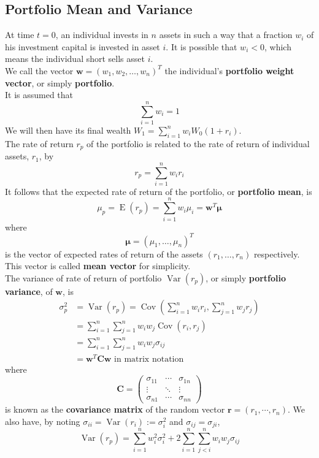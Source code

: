 \documentclass[12pt]{article}
\theoremstyle{definition}
\DeclareMathOperator{\expec}{E}
\DeclareMathOperator{\var}{Var}
\DeclareMathOperator{\cov}{Cov}
\begin{document}
\subsection{Portfolio Mean and Variance}
At time $t=0$, an individual invests in $n$ assets in such a way that a fraction $w_i$ of his investment capital is invested in asset $i$. It is possible that $w_i<0$, which means the individual short sells asset $i$. \\We call the vector $\mathbf{w} = (w_1,w_2,\ldots, w_n)^T$ the individual's \textbf{portfolio weight vector}, or simply \textbf{portfolio}. \\It is assumed that
\[
\sum_{i=1}^n w_i = 1
\] 
We will then have its final wealth $W_1 = \sum_{i=1}^n w_iW_0(1+r_i)$.\\
The rate of return $r_p$ of the portfolio is related to the rate of return of individual assets, $r_1$, by
\[
r_p = \sum_{i=1}^n w_ir_i
\]
It follows that the expected rate of return of the portfolio, or \textbf{portfolio mean}, is
\[
\mu_p = \expec(r_p) = \sum_{i=1}^n w_i\mu_i = \mathbf{w}^T\bm{\mu}
\]
where 
\[
\bm{\mu} = (\mu_1,\ldots, \mu_n)^T
\]
is the vector of expected rates of return of the assets $(r_1,\ldots, r_n)$ respectively. This vector is called \textbf{mean vector} for simplicity.\\
The variance of rate of return of portfolio $\var(r_p)$, or simply \textbf{portfolio variance}, of $\mathbf{w}$, is
\begin{align*}
\sigma_p^2 &= \var(r_p) = \cov(\sum_{i=1}^n w_ir_i,\sum_{j=1}^n w_jr_j )\\
&=\sum_{i=1}^n\sum_{j=1}^n w_iw_j\cov(r_i,r_j)\\
&=\sum_{i=1}^n\sum_{j=1}^n w_iw_j\sigma_{ij}\\
&=\mathbf{w}^T\mathbf{C}\mathbf{w}\text{ in matrix notation}
\end{align*}
where
\[
\mathbf{C} = \begin{pmatrix}
\sigma_{11}&\cdots&\sigma_{1n}\\
\vdots&\ddots&\vdots\\
\sigma_{n1}&\cdots&\sigma_{nn}\end{pmatrix}
\]
is known as the \textbf{covariance matrix} of the random vector $\mathbf{r} = (r_1,\cdots, r_n)$.
We also have, by noting $\sigma_{ii} = \var(r_i) := \sigma_i^2$ and $\sigma_{ij} = \sigma_{ji}$,
\[
\var(r_p) = \sum_{i=1}^n w_i^2 \sigma_i^2 + 2\sum_{i=1}^n\sum_{j<i}^n w_iw_j\sigma_{ij}
\]
\end{document}
